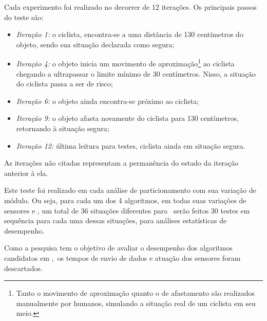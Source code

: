         Cada experimento foi realizado no decorrer de 12 iterações.
        Os principais passos do teste são:
        \begin{itemize}
            \item 
            \textit{Iteração 1:} o ciclista, encontra-se a uma distância de 130 centímetros do objeto, sendo sua situação declarada como segura;
            \item 
            \textit{Iteração 4:} o objeto inicia um movimento de aproximação\footnote{Tanto o movimento de aproximação quanto o de afastamento são realizados manualmente por humanos, simulando a situação real de um ciclista em seu meio.} ao ciclista chegando a ultrapassar o limite mínimo de 30 centímetros. Nisso, a situação do ciclista passa a ser de risco;
            \item
            \textit{Iteração 6:} o objeto ainda encontra-se próximo ao ciclista;
            \item 
            \textit{Iteração 9:} o objeto afasta novamente do ciclista para 130 centímetros, retornando à situação segura;
            \item 
            \textit{Iteração 12:} última leitura para testes, ciclista ainda em situação segura.
        \end{itemize}
    
        As iterações não citadas representam a permanência do estado da iteração anterior à ela.
   
        Este teste foi realizado em cada análise de particionamento com sua variação de módulo. 
        Ou seja, para cada um dos 4 algoritmos, em todas suas variações de sensores e \buffer, um total de 36 situações diferentes para \hs\ serão feitos 30 testes em sequência para cada uma dessas situações, para análises estatísticas de desempenho.
        
        Como a pesquisa tem o objetivo de avaliar o desempenho dos algoritmos candidatos em \hs,\ os tempos de envio de dados e atuação dos sensores foram descartados.
        
